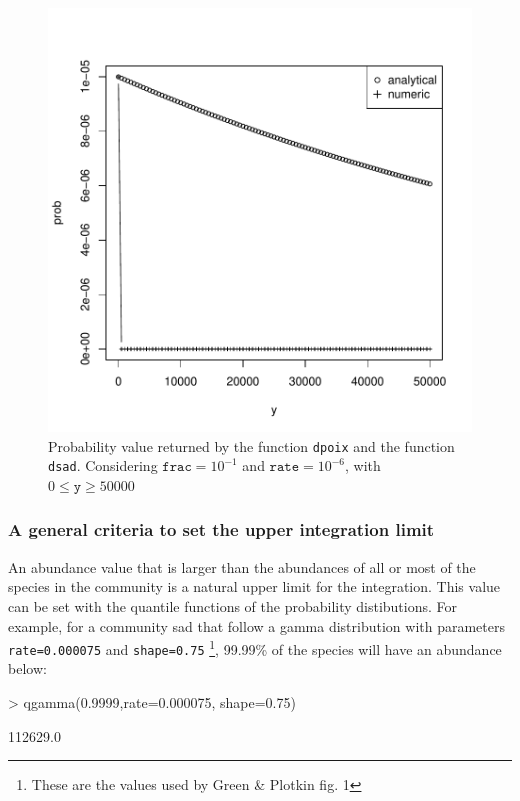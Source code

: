 \documentclass{article}
\newcommand{\code}[1]{\texttt{#1}}
\begin{document}
\begin{figure}[ht]
  \begin{center}
\includegraphics{sads_logbook-013}
\end{center}
\caption{Probability value returned by the function \code{dpoix} and the function \code{dsad}. Considering $\code{frac}=10^{-1}$ and $\code{rate}=10^{-6}$, with $0 \leq \code{y} \geq 50000$}
\label{fig:bad}
\end{figure}

\subsubsection*{A general criteria to set the upper integration limit}
An abundance value that is larger than the abundances of all or most of the  species in the community is a natural upper limit for the integration. This value can be set with the quantile functions of the probability distibutions. For example, for a community sad that follow a gamma distribution with parameters \code{rate=0.000075} and \code{shape=0.75} \footnote{These are the values used by Green \& Plotkin fig. 1}, 99.99\% of the species will have an abundance below:

\begin{Schunk}
\begin{Sinput}
> qgamma(0.9999,rate=0.000075, shape=0.75)
\end{Sinput}
\begin{Soutput}
[1] 112629.0
\end{Soutput}
\end{Schunk}
\end{document}
